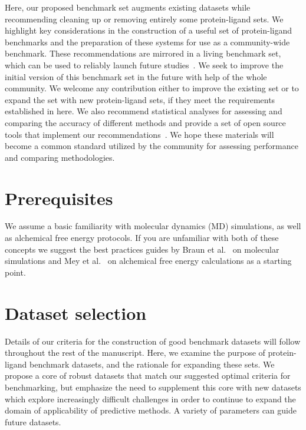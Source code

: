 \documentclass[9pt,bestpractices]{livecoms}
\begin{document}
Here, our proposed benchmark set augments existing datasets while recommending cleaning up or removing entirely some protein-ligand sets. We highlight key considerations in the construction of a useful set of protein-ligand benchmarks and the preparation of these systems for use as a community-wide benchmark. These recommendations are mirrored in a living benchmark set, which can be used to reliably launch future studies~\cite{dfhahn_openforcefield_2021}. We seek to improve the initial version of this benchmark set in the future with help of the whole community. We welcome any contribution either to improve the existing set or to expand the set with new protein-ligand sets, if they meet the requirements established in here. 
%
We also recommend statistical analyses for assessing and comparing the accuracy of different methods and provide a set of open source tools that implement our recommendations~\cite{github_openforcefield_arsenic_2020}. 
%
We hope these materials will become a common standard utilized by the community for assessing performance and comparing methodologies.  


\section{Prerequisites}
We assume a basic familiarity with molecular dynamics (MD) simulations, as well as alchemical free energy protocols. 
If you are unfamiliar with both of these concepts we suggest the best practices guides by Braun et al.~\cite{braunBestPracticesFoundations2019} on molecular simulations and Mey et al.~\cite{meyBestPracticesAlchemical2020} on alchemical free energy calculations as a starting point. 


\section{Dataset selection}
\label{sec:dataset}

Details of our criteria for the construction of good benchmark datasets will follow throughout the rest of the manuscript. 
Here, we examine the purpose of protein-ligand benchmark datasets, and the rationale for expanding these sets.
We propose a core of robust datasets that match our suggested optimal criteria for benchmarking, but emphasize the need to supplement this core with new datasets which explore increasingly difficult challenges in order to continue to expand the domain of applicability of predictive methods. 
A variety of parameters can guide future datasets.
\end{document}
